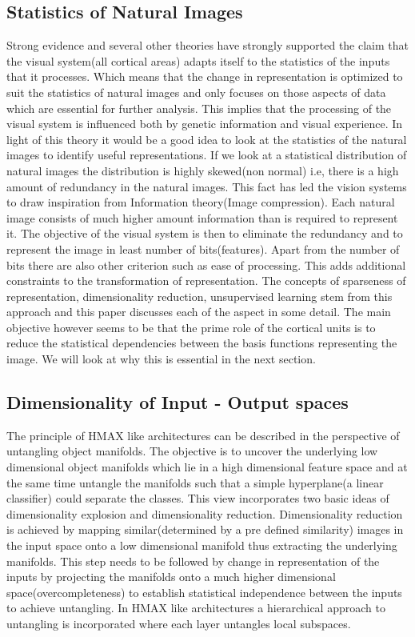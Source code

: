 \documentclass[12pt,twoside]{article}
\theoremstyle{plain}
\theoremstyle{definition}
\theoremstyle{remark}
\begin{document}
\subsection{Statistics of Natural Images}
\label{Subsec:NatImStat}
Strong evidence\cite{BrunoA.Olshausen1996} and several other theories have strongly supported the claim that the visual system(all cortical areas) adapts itself to the statistics of the inputs that it processes. Which means that the change in representation is optimized to suit the statistics of natural images and only focuses on those aspects of data which are essential for further analysis\cite{AapoHyvaerinen2009}. This implies that the processing of the visual system is influenced both by genetic information and visual experience. In light of this theory it would be a good idea to look at the statistics of the natural images to identify useful representations. If we look at a statistical distribution of natural images the distribution is highly skewed(non normal) i.e, there is a high amount of redundancy in the natural images\cite{AapoHyvaerinen2009}. This fact has led the vision systems to draw inspiration from Information theory(Image compression). Each natural image consists of much higher amount information than is required to represent it. The objective of the visual system is then to eliminate the redundancy and to represent the image in least number of bits(features). Apart from the number of bits there are also other criterion such as ease of processing. This adds additional constraints to the transformation of representation. The concepts of sparseness of representation, dimensionality reduction, unsupervised learning stem from this approach and this paper discusses each of the aspect in some detail.  The main objective however seems to be that the prime role of the cortical units is to reduce the statistical dependencies between the basis functions representing the image. We will look at why this is essential in the next section. 
\subsection{Dimensionality of Input - Output spaces}
\label{Subsec:Dimen}
The principle of HMAX like architectures can be described in the perspective of untangling object manifolds\cite{JamesJ.DiCarlo2007}. The objective is to uncover the underlying low dimensional object manifolds which lie in a high dimensional feature space and at the same time untangle the manifolds such that a simple hyperplane(a linear classifier) could separate the classes. This view incorporates two basic ideas of dimensionality explosion and dimensionality reduction. Dimensionality reduction is achieved by mapping similar(determined by a pre defined similarity) images in the input space onto a low dimensional manifold thus extracting the underlying manifolds. This step needs to be followed by change in representation of the inputs by projecting the manifolds onto a much higher dimensional space(overcompleteness) to establish statistical independence between the inputs to achieve untangling. In HMAX like architectures a hierarchical approach to untangling is incorporated where each layer untangles local subspaces\cite{JamesJ.DiCarlo2007}. 
\end{document}
